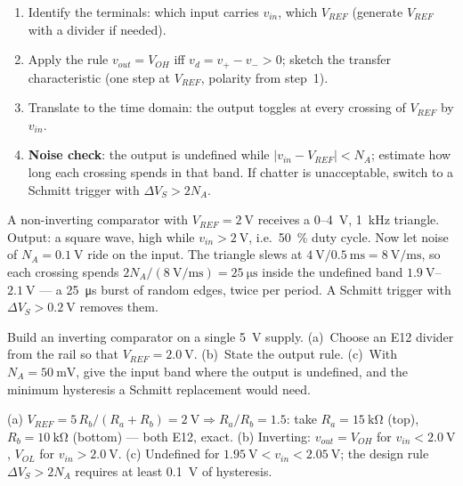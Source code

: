 \documentclass[11pt,a4paper,oneside]{book}
\begin{document}
\begin{protocol}
\begin{enumerate}[leftmargin=1.5cm]
  \item Identify the terminals: which input carries $v_{in}$, which $V_{REF}$
        (generate $V_{REF}$ with a divider if needed).
  \item Apply the rule $v_{out}=V_{OH}$ iff $v_d=v_+-v_->0$; sketch the
        transfer characteristic (one step at $V_{REF}$, polarity from step~1).
  \item Translate to the time domain: the output toggles at every crossing of
        $V_{REF}$ by $v_{in}$.
  \item \textbf{Noise check}: the output is undefined while
        $|v_{in}-V_{REF}|<N_A$; estimate how long each crossing spends in that
        band. If chatter is unacceptable, switch to a Schmitt trigger with
        $\Delta V_S>2N_A$.
\end{enumerate}
\end{protocol}

\begin{wexample}
A non-inverting comparator with $V_{REF}=\qty{2}{\volt}$ receives a
0--\qty{4}{\volt}, \qty{1}{\kilo\hertz} triangle. Output: a square wave, high
while $v_{in}>\qty{2}{\volt}$, i.e.\ \qty{50}{\percent} duty cycle. Now let
noise of $N_A=\qty{0.1}{\volt}$ ride on the input. The triangle slews at
$\qty{4}{\volt}/\qty{0.5}{\milli\second}=\qty{8}{\volt\per\milli\second}$, so
each crossing spends $2N_A/(\qty{8}{\volt\per\milli\second})=
\qty{25}{\micro\second}$ inside the undefined band $\qty{1.9}{\volt}$--$\qty{2.1}{\volt}$
--- a \qty{25}{\micro\second} burst of random edges, twice per period. A
Schmitt trigger with $\Delta V_S>\qty{0.2}{\volt}$ removes them.
\end{wexample}

\begin{exercise}
Build an inverting comparator on a single \qty{5}{\volt} supply.
(a)~Choose an E12 divider from the rail so that $V_{REF}=\qty{2.0}{\volt}$.
(b)~State the output rule. (c)~With $N_A=\qty{50}{\milli\volt}$, give the input
band where the output is undefined, and the minimum hysteresis a Schmitt
replacement would need.
\end{exercise}
\begin{solution}
(a) $V_{REF}=5\,R_b/(R_a+R_b)=\qty{2}{\volt}\Rightarrow R_a/R_b=1.5$: take
$R_a=\qty{15}{\kilo\ohm}$ (top), $R_b=\qty{10}{\kilo\ohm}$ (bottom) --- both
E12, exact. (b) Inverting: $v_{out}=V_{OH}$ for $v_{in}<\qty{2.0}{\volt}$,
$V_{OL}$ for $v_{in}>\qty{2.0}{\volt}$. (c) Undefined for
$\qty{1.95}{\volt}<v_{in}<\qty{2.05}{\volt}$; the design rule
$\Delta V_S>2N_A$ requires at least \qty{0.1}{\volt} of hysteresis.
\end{solution}
\end{document}
